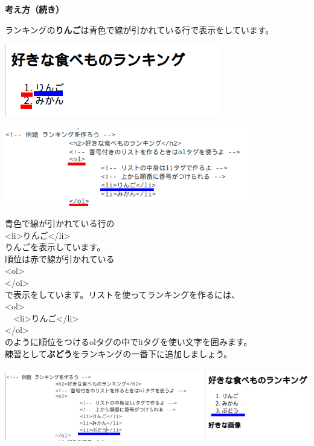 \documentclass[a4paper,12pt]{jarticle}
\begin{document}
\clearpage
\flushleft
\textbf{考え方（続き）}


\bigskip


ランキングの\textbf{りんご}は青色で線が引かれている行で表示をしています。


\bigskip


\includegraphics[width=9.417cm,height=3.173cm]{textbook-img182.png}


\bigskip


\includegraphics[width=10.694cm,height=3.431cm]{textbook-img181.png}


青色で線が引かれている行の\\
{\textless}li{\textgreater}りんご{\textless}/li{\textgreater}\\
りんごを表示しています。\\
順位は赤で線が引かれている\\
{\textless}ol{\textgreater}\\
{\textless}/ol{\textgreater}\\
で表示をしています。リストを使ってランキングを作るには、\\
{\textless}ol{\textgreater}\\
\ \ {\textless}li{\textgreater}りんご{\textless}/li{\textgreater}\\
{\textless}/ol{\textgreater}\\
のように順位をつけるolタグの中でliタグを使い文字を囲みます。\\
練習として\textbf{ぶどう}をランキングの一番下に追加しましょう。\\


\bigskip


\includegraphics[width=15cm,height=3.327cm]{textbook-img183.png}
\end{document}
